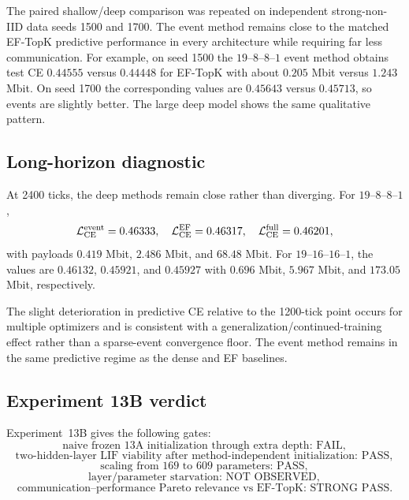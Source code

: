 The paired shallow/deep comparison was repeated on independent strong-non-IID data seeds 1500 and 1700. The event method remains close to the matched EF-TopK predictive performance in every architecture while requiring far less communication. For example, on seed 1500 the $19$--$8$--$8$--$1$ event method obtains test CE $0.44555$ versus $0.44448$ for EF-TopK with about $0.205$ Mbit versus $1.243$ Mbit. On seed 1700 the corresponding values are $0.45643$ versus $0.45713$, so events are slightly better. The large deep model shows the same qualitative pattern.

\subsection{Long-horizon diagnostic}

At 2400 ticks, the deep methods remain close rather than diverging. For $19$--$8$--$8$--$1$,
\begin{equation}
 \mathcal L_{\rm CE}^{\rm event}=0.46333,\quad
 \mathcal L_{\rm CE}^{\rm EF}=0.46317,\quad
 \mathcal L_{\rm CE}^{\rm full}=0.46201,
\end{equation}
with payloads $0.419$ Mbit, $2.486$ Mbit, and $68.48$ Mbit. For $19$--$16$--$16$--$1$, the values are $0.46132$, $0.45921$, and $0.45927$ with $0.696$ Mbit, $5.967$ Mbit, and $173.05$ Mbit, respectively.

The slight deterioration in predictive CE relative to the 1200-tick point occurs for multiple optimizers and is consistent with a generalization/continued-training effect rather than a sparse-event convergence floor. The event method remains in the same predictive regime as the dense and EF baselines.

\subsection{Experiment 13B verdict}

Experiment~13B gives the following gates:
\begin{equation}
 \boxed{\text{naive frozen 13A initialization through extra depth: FAIL}},
\end{equation}
\begin{equation}
 \boxed{\text{two-hidden-layer LIF viability after method-independent initialization: PASS}},
\end{equation}
\begin{equation}
 \boxed{\text{scaling from 169 to 609 parameters: PASS}},
\end{equation}
\begin{equation}
 \boxed{\text{layer/parameter starvation: NOT OBSERVED}},
\end{equation}
\begin{equation}
 \boxed{\text{communication--performance Pareto relevance vs EF-TopK: STRONG PASS}}.
\end{equation}

